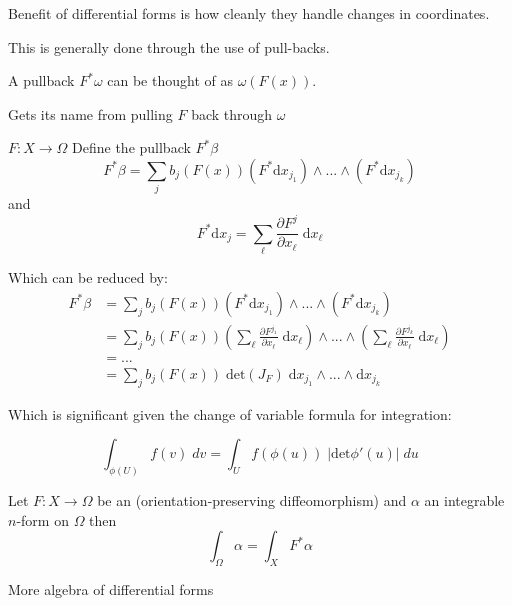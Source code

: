 Benefit of differential forms is how cleanly they handle changes in coordinates.

This is generally done through the use of pull-backs.

A pullback $F^* \omega$ can be thought of as $\omega(F(x))$.

Gets its name from pulling $F$ back through $\omega$

\begin{definition}
$F: X \to \Omega$
Define the pullback $F^* \beta$
\begin{equation}
F^* \beta = \sum_j  b_j ( F(x)) (F^* \text{d}x_{j_1}) \wedge ... \wedge (F^* \text{d} x_{j_k})
\end{equation}
and
\begin{equation}
F^* \text{d}x_j = \sum_\ell \frac{\partial F^j}{\partial x_\ell} \; \text{d} x_\ell
\end{equation}
\end{definition}

Which can be reduced by:
\begin{align}
F^ * \beta & = \sum_j  b_j ( F(x)) (F^* \text{d}x_{j_1}) \wedge ... \wedge (F^* \text{d} x_{j_k}) \\
& = \sum_j  b_j ( F(x))  
\left( \sum_\ell \frac{\partial F^{j_1}}{\partial x_\ell} \; \text{d} x_\ell \right)
\wedge ... \wedge  
\left( \sum_\ell \frac{\partial F^{j_k}}{\partial x_\ell} \; \text{d} x_\ell \right) \\
& = ... \\
& = \sum_j b_j ( F(x)) \; \text{det}\left( J_F \right) \; \text{d}x_{j_1} \wedge ... \wedge \text{d} x_{j_k}
\end{align}

Which is significant given the change of variable formula for integration:

\begin{equation}
\int_{\phi(U)} \! f(v) \; dv = \int_U \! f(\phi(u)) \; |\text{det}\phi'(u)| \; du
\end{equation}

\begin{theorem}
Let $F : X  \to \Omega$ be an (orientation-preserving diffeomorphism) and $\alpha$ an integrable $n$-form on $\Omega$ then
\begin{equation}
\int_\Omega \alpha = \int_X F^* \alpha
\end{equation}
\end{theorem}

More algebra of differential forms

